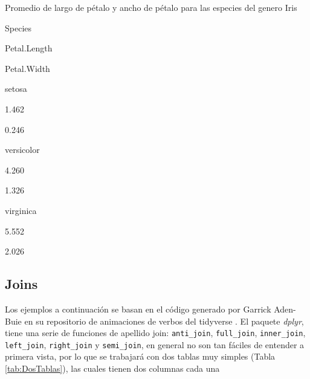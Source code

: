 \documentclass[]{book}
\newenvironment{Shaded}{\begin{snugshade}}{\end{snugshade}}
\newcommand{\KeywordTok}[1]{\textcolor[rgb]{0.13,0.29,0.53}{\textbf{#1}}}
\newcommand{\NormalTok}[1]{#1}
\newcommand{\OperatorTok}[1]{\textcolor[rgb]{0.81,0.36,0.00}{\textbf{#1}}}
\newcommand{\StringTok}[1]{\textcolor[rgb]{0.31,0.60,0.02}{#1}}
\begin{document}
\begin{Shaded}
\end{Shaded}

\begin{Shaded}
\end{Shaded}

\label{tab:Selected}Promedio de largo de pétalo y ancho de pétalo para las
especies del genero Iris

Species

Petal.Length

Petal.Width

setosa

1.462

0.246

versicolor

4.260

1.326

virginica

5.552

2.026

\hypertarget{joins}{%
\subsection{Joins}\label{joins}}

Los ejemplos a continuación se basan en el código generado por Garrick
Aden-Buie en su repositorio de animaciones de verbos del tidyverse
\citep{AdenBuie2018}. El paquete \emph{dplyr}, tiene una serie de
funciones de apellido join: \texttt{anti\_join}, \texttt{full\_join},
\texttt{inner\_join}, \texttt{left\_join}, \texttt{right\_join} y
\texttt{semi\_join}, en general no son tan fáciles de entender a primera
vista, por lo que se trabajará con dos tablas muy simples (Tabla
\ref{tab:DosTablas}), las cuales tienen dos columnas cada una
\end{document}
